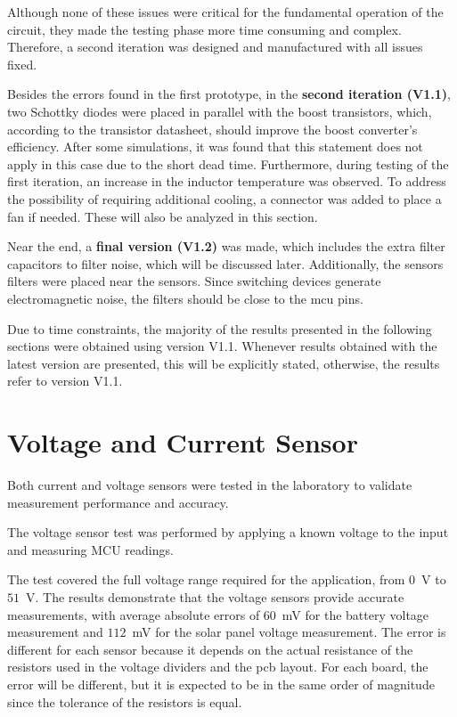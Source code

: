     Although none of these issues were critical for the fundamental operation of the circuit, they made the testing phase more time consuming and complex. Therefore, a second iteration was designed and manufactured with all issues fixed. 

    Besides the errors found in the first prototype, in the \textbf{second iteration (V1.1)}, two Schottky diodes were placed in parallel with the boost transistors, which, according to the transistor datasheet, should improve the boost converter's efficiency. After some simulations, it was found that this statement does not apply in this case due to the short dead time. Furthermore, during testing of the first iteration, an increase in the inductor temperature was observed. To address the possibility of requiring additional cooling, a connector was added to place a fan if needed. These will also be analyzed in this section.

    Near the end, a \textbf{final version (V1.2)} was made, which includes the extra filter capacitors to filter noise, which will be discussed later. Additionally, the sensors filters were placed near the sensors. Since switching devices generate electromagnetic noise, the filters should be close to the \ac{mcu} pins.  

    Due to time constraints, the majority of the results presented in the following sections were obtained using version V1.1. Whenever results obtained with the latest version are presented, this will be explicitly stated, otherwise, the results refer to version V1.1.


\section{Voltage and Current Sensor}
    Both current and voltage sensors were tested in the laboratory to validate measurement performance and accuracy. 

    The voltage sensor test was performed by applying a known voltage to the input and measuring MCU readings. 

    The test covered the full voltage range required for the application, from $0$~V to $51$~V. The results demonstrate that the voltage sensors provide accurate measurements, with average absolute errors of $60$~mV for the battery voltage measurement and $112$~mV for the solar panel voltage measurement. The error is different for each sensor because it depends on the actual resistance of the resistors used in the voltage dividers and the \ac{pcb} layout. For each board, the error will be different, but it is expected to be in the same order of magnitude since the tolerance of the resistors is equal.

